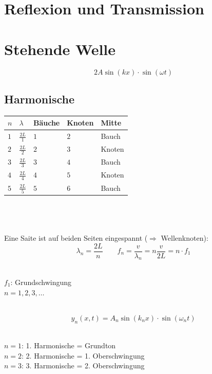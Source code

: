 \section{Reflexion und Transmission}


\section{Stehende Welle}
\[\boxed{
	2A\sin(kx) \cdot \sin(\omega t)
}\]


\subsection{Harmonische}
\noindent
\begin{tabular}{|lllll|}
	\hline
	\rowcolor{white} $n$ & $\lambda$ & Bäuche & Knoten & Mitte \\
	\hline
	\rowcolor{lgray} $1$ & $\frac{2 L}{1}$ & $1$ & $2$ & Bauch \\
	\rowcolor{white} $2$ & $\frac{2 L}{2}$ & $2$ & $3$ & Knoten \\
	\rowcolor{lgray} $3$ & $\frac{2 L}{3}$ & $3$ & $4$ & Bauch \\
	\rowcolor{white} $4$ & $\frac{2 L}{4}$ & $4$ & $5$ & Knoten \\
	\rowcolor{lgray} $5$ & $\frac{2 L}{5}$ & $5$ & $6$ & Bauch \\
	\hline
\end{tabular}
\\\\\\
Eine Saite ist auf beiden Seiten eingespannt ($\Rightarrow$ Wellenknoten):
\[
	\lambda_n = \frac{2L}{n} \qquad
	f_n = \frac{v}{\lambda_n} = n \frac{v}{2L} = n \cdot f_1
\]
\\
\begin{footnotesize}
	$f_1$: Grundschwingung\\
	$n=1,2,3,\ldots$
\end{footnotesize}
\\
\[\boxed{
	y_n(x,t)=A_n \sin(k_nx) \cdot \sin(\omega_nt)
}\]
\\
\begin{footnotesize}
	$n=1$: 1. Harmonische = Grundton\\
	$n=2$: 2. Harmonische = 1. Oberschwingung\\
	$n=3$: 3. Harmonische = 2. Oberschwingung\\
\end{footnotesize}

